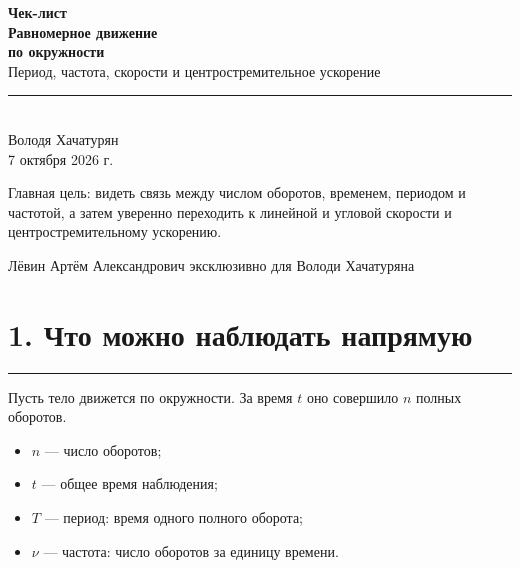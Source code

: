 \documentclass[a4paper,12pt]{article}
\newcommand{\sectionrule}{\par\vspace{0.25em}\noindent\color{accent}\rule{\linewidth}{0.55pt}\color{textgray}\par\vspace{0.25em}}
\begin{document}
\thispagestyle{empty}
\begin{center}
\vspace*{22mm}
{\Large\color{darkaccent}\textbf{Чек-лист}}\\[7mm]
{\Huge\bfseries Равномерное движение\\[2mm] по окружности}\\[8mm]
{\large Период, частота, скорости и центростремительное ускорение}\\[14mm]
\color{accent}\rule{0.62\linewidth}{0.8pt}\\[12mm]
{\Large Володя Хачатурян}\\[5mm]
{\large 7 октября 2026 г.}\\[22mm]
\begin{minipage}{0.80\linewidth}
\centering
\large
Главная цель: видеть связь между числом оборотов, временем, периодом и частотой, а затем уверенно переходить к линейной и угловой скорости и центростремительному ускорению.
\end{minipage}
\end{center}

\vfill
\begin{center}
{\small\color{darkaccent}Лёвин Артём Александрович эксклюзивно для Володи Хачатуряна}
\end{center}
\vspace{4mm}
\clearpage

\section*{1. Что можно наблюдать напрямую}
\sectionrule

Пусть тело движется по окружности. За время $t$ оно совершило $n$ полных оборотов.

\begin{itemize}
  \item $n$ — число оборотов;
  \item $t$ — общее время наблюдения;
  \item $T$ — период: время одного полного оборота;
  \item $\nu$ — частота: число оборотов за единицу времени.
\end{itemize}
\end{document}
